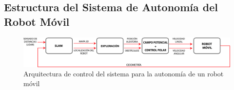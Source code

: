 
\subsection{Estructura del Sistema de Autonomía del Robot Móvil}

\begin{figure}%
	\centering \footnotesize
	\includegraphics[width=1.07\textwidth]{images/estructura_autonomia.jpg}
	\captionsetup{font=footnotesize}
	\caption{Arquitectura de control del sistema para la autonomía de un robot móvil}
	\label{fig:AutoSist}
\end{figure}

